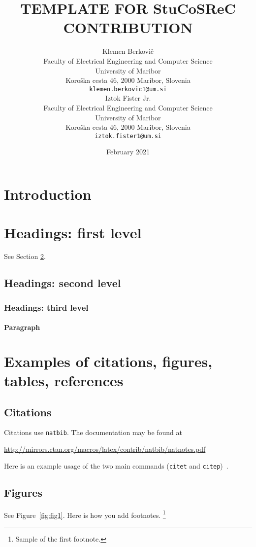\documentclass{styles/stucosrec_article}
\title{\latex TEMPLATE FOR StuCoSReC CONTRIBUTION}
\author{
	Klemen Berkovi\v{c} \\
	Faculty of Electrical Engineering and Computer Science\\
	University of Maribor\\
	Koro\v{s}ka cesta 46, 2000 Maribor, Slovenia \\
	\texttt{klemen.berkovic1@um.si} \\
	\And
	Iztok Fister Jr. \\
	Faculty of Electrical Engineering and Computer Science\\
	University of Maribor\\
	Koro\v{s}ka cesta 46, 2000 Maribor, Slovenia \\
	\texttt{iztok.fister1@um.si} \\
}
\date{February 2021}
\begin{document}
	
	\begin{abstract}
		\lipsum[1]
	\end{abstract}
		
		
	\section{Introduction}
	\lipsum[2]
	\lipsum[3]
	
	
	\section{Headings: first level}
	\label{sec:headings}
	
	\lipsum[4] See Section \ref{sec:headings}.
	
	\subsection{Headings: second level}
	\lipsum[5]
	
	\subsubsection{Headings: third level}
	\lipsum[6]
	
	\paragraph{Paragraph}
	\lipsum[7]	
	
	\section{Examples of citations, figures, tables, references}
	\label{sec:others}
	
	\subsection{Citations}
	Citations use \verb+natbib+. The documentation may be found at
	\begin{center}
		\url{http://mirrors.ctan.org/macros/latex/contrib/natbib/natnotes.pdf}
	\end{center}
	
	Here is an example usage of the two main commands (\verb+citet+ and \verb+citep+)~\cite{vrbancic2019transfer}.
	
	\subsection{Figures}
	\lipsum[10]
	See Figure~\ref{fig:fig1}. Here is how you add footnotes. \footnote{Sample of the first footnote.}
	\lipsum[11]
	
\end{document}
